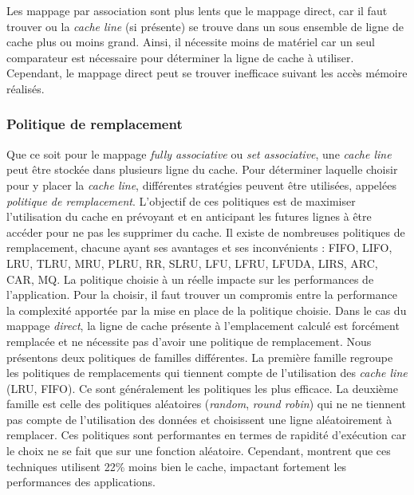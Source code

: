 Les mappage par association sont plus lents que le mappage direct, car il faut trouver ou la \textit{cache line} (si présente) se trouve dans un sous ensemble de ligne de cache plus ou moins grand. Ainsi, il nécessite moins de matériel car un seul comparateur est nécessaire pour déterminer la ligne de cache à utiliser. Cependant, le mappage direct peut se trouver  inefficace suivant les accès mémoire réalisés.



\subsubsection{Politique de remplacement}
Que ce soit pour le mappage \textit{fully associative} ou \textit{set associative}, une \textit{cache line} peut être stockée dans plusieurs ligne du cache. Pour déterminer laquelle choisir pour y placer la \textit{cache line}, différentes stratégies peuvent être utilisées, appelées \textit{politique de remplacement}. L'objectif de ces politiques est de maximiser l'utilisation du cache en prévoyant et en anticipant les futures lignes à être accéder pour ne pas les supprimer du cache. Il existe de nombreuses politiques de remplacement, chacune ayant ses avantages et ses inconvénients \cite{wikipedia2_2019}: FIFO, LIFO, LRU, TLRU, MRU, PLRU, RR, SLRU, LFU, LFRU, LFUDA, LIRS, ARC, CAR, MQ. La politique choisie à un réelle impacte sur les performances de l'application. Pour la choisir, il faut trouver un compromis entre la performance la complexité apportée par la mise en place de la politique choisie. Dans le cas du mappage \textit{direct}, la ligne de cache présente à l'emplacement calculé est forcément remplacée et ne nécessite pas d'avoir une politique de remplacement. Nous présentons deux politiques de familles différentes. La première famille regroupe les politiques de remplacements qui tiennent compte de l'utilisation des \textit{cache line} (LRU, FIFO). Ce sont généralement les politiques les plus efficace. La deuxième famille est celle des politiques aléatoires (\textit{random}, \textit{round robin}) qui ne ne tiennent pas compte de l'utilisation des données et choisissent une ligne aléatoirement à remplacer. Ces politiques sont performantes en termes de rapidité d'exécution car le choix ne se fait que sur une fonction aléatoire. Cependant, \cite{Al-Zoubi:2004:PEC:986537.986601} montrent que ces techniques utilisent 22\% moins bien le cache, impactant fortement les performances des applications.


